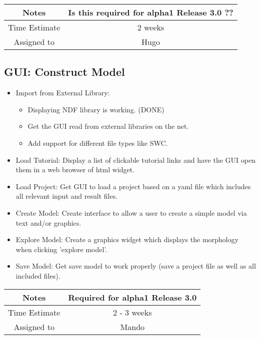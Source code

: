 \documentclass[12pt]{article}
\begin{document}
{
  \vspace{5mm}
  \centering
  \begin{tabular}{|c|c|}
    \hline
    Notes
    & Is this required for alpha1 Release 3.0 ?? \\
    \hline
    Time Estimate
    & 2 weeks \\
    \hline
    Assigned to
    & Hugo \\
    \hline
  \end{tabular}
}


\subsection{GUI: Construct Model}

\begin{itemize}
\item Import from External Library:
  \begin{itemize}
  \item Displaying NDF library is working. (DONE)
  \item Get the GUI read from external libraries on the net.
  \item Add support for different file types like SWC.
  \end{itemize}
\item Load Tutorial: Display a list of clickable tutorial links and
  have the GUI open them in a web browser of html widget.
\item Load Project: Get GUI to load a project based on a yaml file
  which includes all relevant input and result files.
\item Create Model: Create interface to allow a user to create a
  simple model via text and/or graphics.
\item Explore Model: Create a graphics widget which displays the
  morphology when clicking 'explore model'.
\item Save Model: Get save model to work properly (save a project file
  as well as all included files).
\end{itemize}

{
  \vspace{5mm}
  \centering
  \begin{tabular}{|c|c|}
    \hline
    Notes
    & Required for alpha1 Release 3.0 \\
    \hline
    Time Estimate
    & 2 - 3 weeks \\
    \hline
    Assigned to
    & Mando \\
    \hline
  \end{tabular}
}
\end{document}

